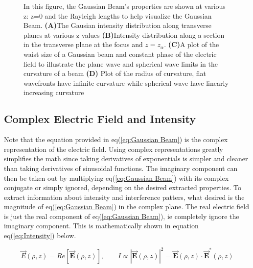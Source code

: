 \documentclass[a4paper]{book}
\newcommand{\imginput}[1]{} %
\begin{document}
			
			\begin{figure} [!ht]
				\centering
				\def\svgwidth{\columnwidth}
				\resizebox{16cm}{!}{\imginput{images/gaus-beam-prop.pdf_tex}}
				\caption{In this figure, the Gaussian Beam's properties are shown at various z: z=0 and the Rayleigh lengths to help visualize the Gaussian Beam.
					\newline
					{\bfseries (A)}The Gausian intensity distribution along transverse planes at various z values
					\newline
					{\bfseries (B)}Intensity distribution along a section in the transverse plane at the focus and  $z=z_\alpha$.
					\newline
					{\bfseries (C)}A plot of the waist size of a Gaussian beam and constant phase of the electric field to illustrate the plane wave and spherical wave limits in the curvature of a beam
					\newline
					{\bfseries (D)} Plot of the radius of curvature, flat wavefronts have infinite curvature while spherical wave have linearly increasing curvature} 
				\label{fig:gaus-beam-prop}
			\end{figure}	
			
		\subsection{Complex Electric Field and Intensity}
			\label{subsec:Complex Electric Field and Intensity}
			Note that the equation provided in eq(\ref{eq:Gaussian Beam}) is the complex representation of the electric field. Using complex representations greatly simplifies the math since taking derivatives of exponentials is simpler and cleaner than taking derivatives of sinusoidal functions. The imaginary component can then be taken out by multiplying eq(\ref{eq:Gaussian Beam}) with its complex conjugate or simply ignored, depending on the desired extracted properties. To extract information about intensity and interference patters, what desired is the magnitude of eq(\ref{eq:Gaussian Beam}) in the complex plane. 
			The real electric field is just the real component of eq(\ref{eq:Gaussian Beam}), ie completely ignore the imaginary component. This is mathematically shown in equation eq(\ref{eq:Intensity}) below.
			
			\begin{equation} 
				\vec{E}(\rho,z)=Re[\vec{\textbf{E}}(\rho,z)], \qquad
				\textit{I} \propto |\vec{\textbf{E}}(\rho,z)|^2=\vec{\textbf{E}}(\rho,z)\cdot \vec{\textbf{E}}^*(\rho,z)
				\label{eq:Intensity}
			\end{equation}
			
\end{document}
